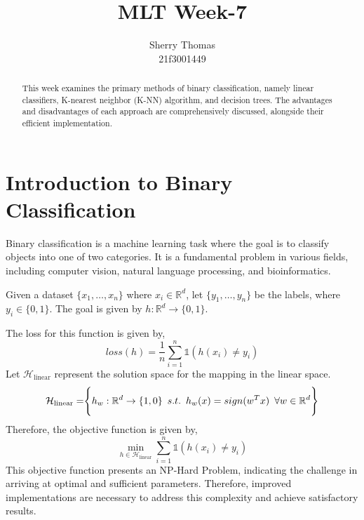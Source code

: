 \documentclass[
]{article}
\author{}
\date{}
\begin{document}
\title{MLT Week-7}
\author{Sherry Thomas \\ 21f3001449}

\maketitle
\tableofcontents

\begin{abstract}
This week examines the primary methods of binary classification, namely linear classifiers, K-nearest neighbor (K-NN) algorithm, and decision trees. The advantages and disadvantages of each approach are comprehensively discussed, alongside their efficient implementation.
\end{abstract}

\hypertarget{introduction-to-binary-classification}{%
\section{Introduction to Binary
Classification}\label{introduction-to-binary-classification}}

Binary classification is a machine learning task where the goal is to
classify objects into one of two categories. It is a fundamental problem
in various fields, including computer vision, natural language
processing, and bioinformatics.

Given a dataset \(\{x_1, \ldots, x_n\}\) where \(x_i \in \mathbb{R}^d\),
let \(\{y_1, \ldots, y_n\}\) be the labels, where \(y_i \in \{0, 1\}\).
The goal is given by \(h: \mathbb{R}^d \rightarrow \{0, 1\}\).

The loss for this function is given by, \[
loss(h)=\frac{1}{n}\sum ^n _{i=1}\mathbb{1}\left ( h(x_i) \ne y_i \right )
\] Let \(\mathcal{H}_{\text{linear}}\) represent the solution space for
the mapping in the linear space. \[
\mathcal{H}_{\text{linear}}=\Biggr \lbrace{h_w: \mathbb{R}^d \rightarrow \{1, 0\} \hspace{0.5em} s.t. \hspace{0.5em} h_w(x)=sign(w^Tx) \hspace{0.5em} \forall w \in \mathbb{R}^d } \Biggr \rbrace
\] Therefore, the objective function is given by, \[
\min _{h \in \mathcal{H}_{\text{linear}}} \sum _{i=1} ^n \mathbb{1}\left ( h(x_i) \ne y_i \right )
\] This objective function presents an NP-Hard Problem, indicating the
challenge in arriving at optimal and sufficient parameters. Therefore,
improved implementations are necessary to address this complexity and
achieve satisfactory results.
\end{document}
